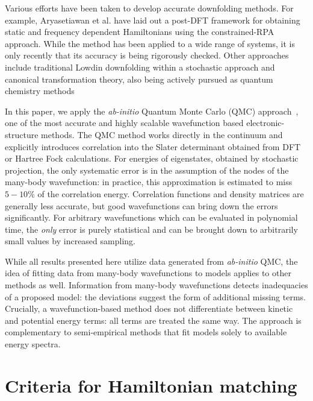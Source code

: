 \documentclass[prl,12pt,onecolumn,nofootinbib,notitlepage,english,superscriptaddress]{revtex4-1}
\begin{document}
Various efforts have been taken to develop accurate downfolding 
methods. For example, Aryasetiawan et al.
have laid out a post-DFT framework for obtaining 
static and frequency dependent Hamiltonians using the 
constrained-RPA approach. While the method has been applied to 
a wide range of systems, 
it is only recently that its accuracy is being rigorously checked. 
Other approaches include traditional Lowdin downfolding 
within a stochastic approach and 
canonical transformation theory, 
also being actively pursued as quantum chemistry 
methods

In this paper, we apply the \emph{ab-initio} 
Quantum Monte Carlo (QMC) approach~\cite{Ceperley_Alder,Foulkes_review}, 
one of the most accurate and highly scalable wavefunction based electronic-structure 
methods. The QMC method works directly in the continuum and 
explicitly introduces correlation into the Slater determinant obtained 
from DFT or Hartree Fock calculations. For energies of eigenstates, obtained 
by stochastic projection, the only systematic error is in the assumption of the 
nodes of the many-body wavefunction: in practice, 
this approximation is estimated to miss $ 5 - 10 \%$ 
of the correlation energy. Correlation functions and density matrices are generally 
less accurate, but good wavefunctions can bring down the errors significantly. 
For arbitrary wavefunctions which can be evaluated in polynomial time, 
the \emph{only} error is purely statistical and 
can be brought down to arbitrarily small values by increased sampling.

While all results presented here utilize data generated from 
\emph{ab-initio} QMC, the idea of fitting data from many-body wavefunctions to models applies 
to other methods as well. Information from many-body wavefunctions detects 
inadequacies of a proposed model: the deviations suggest the form of additional missing terms. 
Crucially, a wavefunction-based method does not differentiate between kinetic 
and potential energy terms: all terms are treated the same way. 
The approach is complementary to semi-empirical methods that 
fit models solely to available energy spectra. 


\section{Criteria for Hamiltonian matching}
\end{document}
